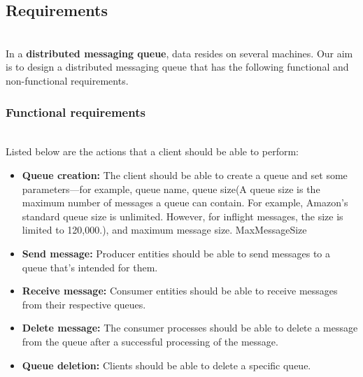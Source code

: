 

\subsection{Requirements}\label{WMDX0GYBv-mJ7IwlZZWYn}
\\
In a \textbf{distributed messaging queue}, data resides on several machines. Our aim is to design a distributed messaging queue that has the following functional and non-functional requirements.

\subsubsection{Functional requirements}\label{KP36CB7114DhAtEq_nS_K}
\\
Listed below are the actions that a client should be able to perform:

\begin{itemize}
\item
\protect{}\label{gmyh8KO8p1PZYIvB7ZrY0}
\textbf{Queue creation:} The client should be able to create a queue and set some parameters---for example, queue name, queue size(A queue size is the maximum number of messages a queue can contain. For example, Amazon's standard queue size is unlimited. However, for inflight messages, the size is limited to 120,000.), and maximum message size. MaxMessageSize
\item
\protect{}\label{nSTSnL3XyCvKXO3yl5Pi1}
\textbf{Send message:} Producer entities should be able to send messages to a queue that's intended for them.
\item
\protect{}\label{XctGuR3Rvpy602YsAFB69}
\textbf{Receive message:} Consumer entities should be able to receive messages from their respective queues.
\item
\protect{}\label{Lc4n3JjE0kF6V2tjE4bTA}
\textbf{Delete message:} The consumer processes should be able to delete a message from the queue after a successful processing of the message.
\item
\protect{}\label{phvQd8rWl3rd_mJu_HTsJ}
\textbf{Queue deletion:} Clients should be able to delete a specific queue.
\end{itemize}


